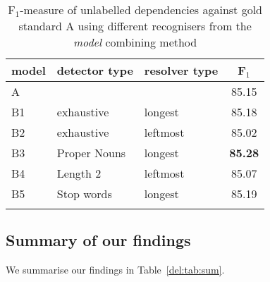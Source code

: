 \documentclass[output=paper]{langsci/langscibook}
\begin{document}
\begin{table}[h]
    \centering
    \begin{tabular}{l l l c} %
      \lsptoprule
        \textnormal{model}
        & \textnormal{detector type}
        & \textnormal{resolver type}
        & \textnormal{F$_1$}
        \\ %
        \midrule
        A &  &  & 85.15\\ \midrule
        B1 & exhaustive & longest & 85.18 \\
        B2 & exhaustive & leftmost & 85.02 \\
        B3 & Proper Nouns & longest & \textbf{85.28} \\
        B4 & Length 2 & leftmost & 85.07 \\
        B5 & Stop words & longest & 85.19 \tabularnewline %
        \lspbottomrule
    \end{tabular}
    \caption{F$_1$-measure of unlabelled dependencies against gold standard A using different recognisers from the \textit{model} combining method\label{del:tab:res3}}
\end{table}

\subsection{Summary of our findings}
We summarise our findings in Table~\ref{del:tab:sum}.
\begin{table}[h]
    \centering
    \caption{Summary of our findings\label{del:tab:sum}}
\end{table}
\end{document}
